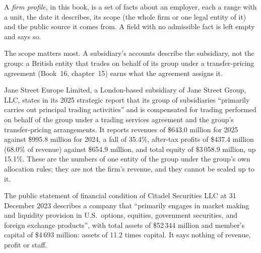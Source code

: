 \begin{definition}\label{def:in:proprietary-market-makers-and-high-frequency-firms:profile}
A \emph{firm profile}, in this book, is a set of facts about an employer, each a range with a unit,
the date it describes, its scope (the whole firm or one legal entity of it) and the public source it comes from. A field
with no admissible fact is left empty and says so.
\end{definition}

The scope matters most. A subsidiary's accounts describe the subsidiary, not the group: a British entity that trades on
behalf of its group under a transfer-pricing agreement (Book~16, chapter~15) earns what the agreement assigns it.

\begin{example}\label{ex:in:proprietary-market-makers-and-high-frequency-firms:jse}
Jane Street Europe Limited, a London-based subsidiary of Jane Street Group, LLC, states in its 2025 strategic report
that its group of subsidiaries ``primarily carries out principal trading activities'' and is compensated for trading
performed on behalf of the group under a trading services agreement and the group's transfer-pricing arrangements. It
reports revenues of \$643.0 million for 2025 against \$995.8 million for 2024, a fall of 35.4\%, after-tax profits of
\$437.4 million (68.0\% of revenue) against \$654.9 million, and total equity of \$3\,058.9 million, up 15.1\%. These
are the numbers of one entity of the group under the group's own allocation rules; they are not the firm's revenue, and
they cannot be scaled up to it.
\end{example}

\begin{example}\label{ex:in:proprietary-market-makers-and-high-frequency-firms:cdrg}
The public statement of financial condition of Citadel Securities LLC at 31 December 2023 describes a company that
``primarily engages in market making and liquidity provision in U.S.\ options, equities, government securities, and
foreign exchange products'', with total assets of \$52\,344 million and member's capital of \$4\,693 million: assets of
11.2 times capital. It says nothing of revenue, profit or staff.
\end{example}

